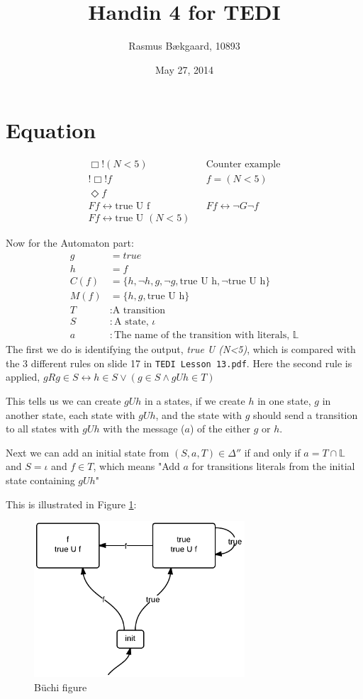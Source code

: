 \documentclass{article}
\title{Handin 4 for TEDI}
\author{Rasmus Bækgaard, 10893}
\date{May 27, 2014}
\begin{document}
\maketitle

\section{Equation} 

\begin{align*}
\Box ! ( N < 5)  && \text{Counter example} \\
! \Box ! f && f = (N < 5)\\
\Diamond f \\
F f \leftrightarrow \text{true U f}  && F f \leftrightarrow \neg G \neg f\\
F f \leftrightarrow \text{true U }(N < 5) 
\end{align*}

Now for the Automaton part: 
\begin{align*}
g &= true \\
h &= f \\
C(f) &= \{ h, \neg h, g, \neg g, \text{true U h}, \neg\text{true U h}\} \\
M(f) &= \{ h, g, \text{true U h}\} \\
T &: \text{A transition} \\
S &: \text{A state, } \iota \\
a &:\text{The name of the transition with literals, }\mathbb{L}
\end{align*}
The first we do is identifying the output, \textit{true U (N<5)}, which is compared with the 3 different rules on slide 17 in \texttt{TEDI Lesson 13.pdf}.
Here the second rule is applied, $g  R g \in S \leftrightarrow h \in S \vee (g \in S \wedge g U h \in T)$

This tells us we can create $g U h$ in a states, if we create $h$ in one state, $g$ in another state, each state with $ g U h$, and the state with $g$ should send a transition to all states with $g U h$ with the message ($a$) of the either $g$ or $h$.

Next we can add an initial state from $(S, a, T) \in \Delta''$ if and only if $a = T \cap \mathbb{L}$ and $ S= \iota $ and $ f \in T$, which means "Add $a$ for transitions literals from the initial state containing $g U h$"

This is illustrated in Figure \ref{fig:the}:
\begin{figure}[H]
\centering
\includegraphics[width=0.7\textwidth]{Basic}
\caption{Büchi figure}
\label{fig:the}
\end{figure}
\end{document}
